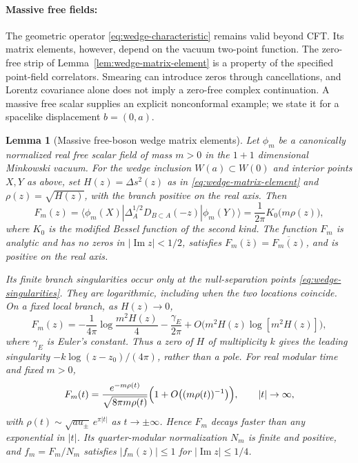 \documentclass[a4paper,11pt]{article}
\newtheorem{lemma}[theorem]{Lemma}
\theoremstyle{definition}
\begin{document}
\paragraph{Massive free fields:}
The geometric operator \eqref{eq:wedge-characteristic} remains valid beyond CFT. Its matrix elements, however, depend on the vacuum two-point function. The zero-free strip of Lemma~\ref{lem:wedge-matrix-element} is a property of the specified point-field correlators. Smearing can introduce zeros through cancellations, and Lorentz covariance alone does not imply a zero-free complex continuation. A massive free scalar supplies an explicit nonconformal example; we state it for a spacelike displacement $b=(0,a)$.

\begin{lemma}[Massive free-boson wedge matrix elements]
\label{lem:massive-free-boson}
Let $\phi_m$ be a canonically normalized real free scalar field of mass $m>0$ in the $1+1$ dimensional Minkowski vacuum. For the wedge inclusion $W(a)\subset W(0)$ and interior points $X,Y$ as above, set $H(z)=\Delta s^2(z)$ as in \eqref{eq:wedge-matrix-element} and $\rho(z)=\sqrt{H(z)}$, with the branch positive on the real axis. Then
\begin{equation}
 F_m(z)=\langle\phi_m(X)|\Delta_A^{1/2}D_{B\subset A}(-z)|\phi_m(Y)\rangle=\frac1{2\pi}K_0\bigl(m\rho(z)\bigr),
 \label{eq:massive-wedge}
\end{equation}
where $K_0$ is the modified Bessel function of the second kind. The function $F_m$ is analytic and has no zeros in $|\operatorname{Im}z|<1/2$, satisfies $F_m(\bar z)=\overline{F_m(z)}$, and is positive on the real axis.

Its finite branch singularities occur only at the null-separation points \eqref{eq:wedge-singularities}. They are logarithmic, including when the two locations coincide. On a fixed local branch, as $H(z)\to0$,
\begin{equation}
 F_m(z)=-\frac1{4\pi}\log\frac{m^2H(z)}4-\frac{\gamma_E}{2\pi}+O\bigl(m^2H(z)\log[m^2H(z)]\bigr),
 \label{eq:massive-short-distance}
\end{equation}
where $\gamma_E$ is Euler's constant. Thus a zero of $H$ of multiplicity $k$ gives the leading singularity $-k\log(z-z_0)/(4\pi)$, rather than a pole. For real modular time and fixed $m>0$,
\begin{equation}
 F_m(t)=\frac{e^{-m\rho(t)}}{\sqrt{8\pi m\rho(t)}}\Bigl(1+O\bigl((m\rho(t))^{-1}\bigr)\Bigr),\qquad|t|\to\infty,
 \label{eq:massive-long-distance}
\end{equation}
with $\rho(t)\sim\sqrt{au_\pm}\,e^{\pi|t|}$ as $t\to\pm\infty$. Hence $F_m$ decays faster than any exponential in $|t|$. Its quarter-modular normalization $N_m$ is finite and positive, and $f_m=F_m/N_m$ satisfies $|f_m(z)|\le1$ for $|\operatorname{Im}z|\le1/4$.
\end{lemma}
\end{document}
